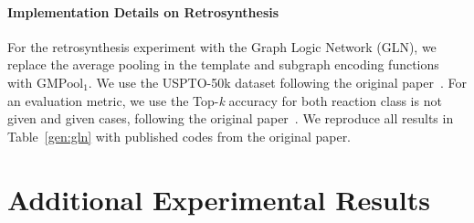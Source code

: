 \paragraph{Implementation Details on Retrosynthesis}
For the retrosynthesis experiment with the Graph Logic Network (GLN), we replace the average pooling in the template and subgraph encoding functions with $\text{GMPool}_1$. We use the USPTO-50k dataset following the original paper~\citep{GLN}. For an evaluation metric, we use the Top-\textit{k} accuracy for both reaction class is not given and given cases, following the original paper~\citep{GLN}. We reproduce all results in Table~\ref{gen:gln} with published codes from the original paper. 


\section{Additional Experimental Results}


